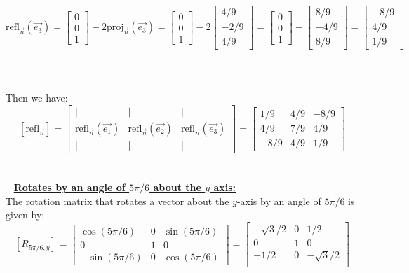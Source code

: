 \documentclass{article}
\begin{document}
 \\\\
$
\text{refl}_{\vec{n}}(\vec{e_3})=
\begin{bmatrix}0\\0\\1\end{bmatrix}
-2\text{proj}_{\vec{n}}(\vec{e_3})
=\begin{bmatrix}0\\0\\1\end{bmatrix}-2\begin{bmatrix}4/9\\-2/9\\4/9\end{bmatrix}
=\begin{bmatrix}0\\0\\1\end{bmatrix}-\begin{bmatrix}8/9\\-4/9\\8/9\end{bmatrix}
=\begin{bmatrix}-8/9\\4/9\\1/9\end{bmatrix}$ \\ \\\\
Then we have:
$$[\text{refl}_{\vec{n}}]= \begin{bmatrix}
| & | & | \\
\text{refl}_{\vec{n}}(\vec{e_{1}}) & 
\text{refl}_{\vec{n}}(\vec{e_{2}}) & 
\text{refl}_{\vec{n}}(\vec{e_{3}}) \\
| & | & |
\end{bmatrix}=\begin{bmatrix}
    1/9 & 4/9 &- 8/9\\
    4/9 & 7/9 & 4/9\\
    -8/9 & 4/9 & 1/9
\end{bmatrix}$$ \\ \\ 
\textbf{\underline{Rotates by an angle of $5\pi / 6$ about the $y$ axis:}}\\
The rotation matrix that rotates a vector about the $y$-axis by an angle of $5\pi/6$ is given by:$$[R_{5\pi/6,y}]=\begin{bmatrix}
\cos(5\pi/6) & 0 & \sin(5\pi/6) \\
0 & 1 & 0 \\
-\sin(5\pi/6) & 0 & \cos (5\pi/6)
\end{bmatrix}=\begin{bmatrix}
     -\sqrt{3}/2&0 & 1/2\\
    0&1 &0 \\
    -1/2&0 & -\sqrt{3}/2\\
\end{bmatrix}$$
\end{document}
